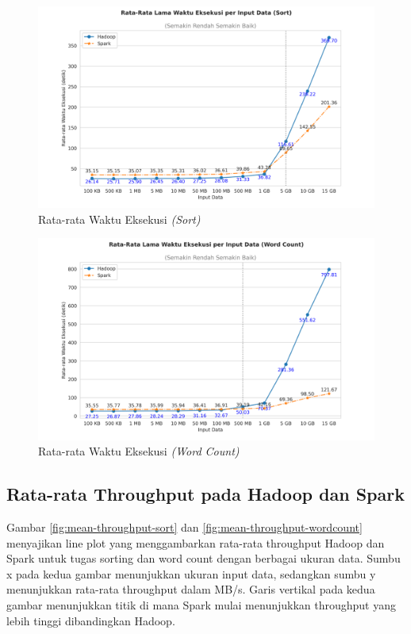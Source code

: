 \begin{figure}[h]
    \centering
    \includegraphics[width=1\textwidth]{figures/ch04/2-mean-lama-waktu-eksekusi-sort.png}
    \caption{Rata-rata Waktu Eksekusi \textit{(Sort)}}
    \label{fig:mean-dur-sort}
\end{figure}

\begin{figure}[h]
    \centering
    \includegraphics[width=1\textwidth]{figures/ch04/2-mean-lama-waktu-eksekusi-wordcount.png}
    \caption{Rata-rata Waktu Eksekusi \textit{(Word Count)}}
    \label{fig:mean-dur-wordcount}
\end{figure}

\subsection {Rata-rata Throughput pada Hadoop dan Spark}

Gambar \ref{fig:mean-throughput-sort} dan \ref{fig:mean-throughput-wordcount} menyajikan line plot yang menggambarkan rata-rata throughput Hadoop dan Spark untuk tugas sorting dan word count dengan berbagai ukuran data. Sumbu x pada kedua gambar menunjukkan ukuran input data, sedangkan sumbu y menunjukkan rata-rata throughput dalam MB/s. Garis vertikal pada kedua gambar menunjukkan titik di mana Spark mulai menunjukkan throughput yang lebih tinggi dibandingkan Hadoop.

